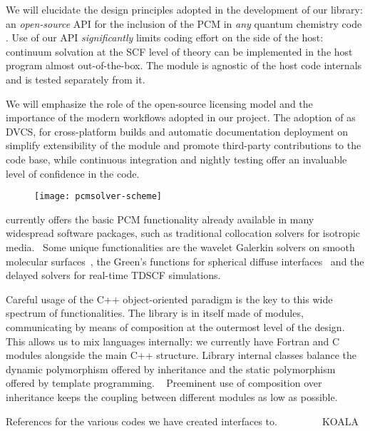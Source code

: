 We will elucidate the design principles adopted in the development of our
\pcmsolver library: an \emph{open-source} \acs{API} for the inclusion of the
PCM in \emph{any} quantum chemistry code \cite{PCMSolver}.  Use of our
\acs{API} \emph{significantly} limits coding effort on the side of the host:
continuum solvation at the \acs{SCF}
level of theory can be implemented in the host program almost out-of-the-box.  The module is
agnostic of the host code internals and is tested separately from it.

We will emphasize the role of the open-source licensing model and the
importance of the modern workflows adopted in our project.  The adoption
of \git as \acs{DVCS}, \cmake for cross-platform builds and automatic
documentation deployment on \readthedocs simplify extensibility of the
module and promote third-party contributions to the code base, while
continuous integration and nightly testing offer an invaluable level of
confidence in the code.

\begin{figure}[!htb]
  \centering
  \texttt{[image: pcmsolver-scheme]}
\end{figure}

\pcmsolver currently offers the basic PCM functionality already
available in many widespread software packages, such as traditional
collocation solvers for isotropic media.~\autocite{Tomasi2005-vm}
Some unique functionalities are the wavelet Galerkin solvers on smooth
molecular surfaces~\autocite{Weijo2010-hy, Bugeanu2015-tp}, the Green’s
functions for spherical diffuse interfaces~\autocite{DiRemigio2016-nn} and
the delayed solvers for real-time \acl{TDSCF}
simulations.~\autocite{Corni2015-pe}

Careful usage of the C++ object-oriented paradigm is the key to this
wide spectrum of functionalities. The library is in itself made of
modules, communicating by means of composition at the outermost
level of the design.
This allows us to mix languages internally: we currently have Fortran
and C modules alongside the main C++ structure.
Library internal classes balance the dynamic polymorphism offered by
inheritance and the static polymorphism offered by template programming.
~\autocite{Alexandrescu2001-bp, Sutter2004-nt, Langr2012-js}
Preeminent use of composition over inheritance keeps the coupling
between different modules as low as possible.~\autocite{Gamma1995-fd}

References for the various codes we have created interfaces to.
\psicode~\autocite{Turney2012-de}
\DIRAC~\autocite{DIRAC15}
\DALTON~\autocite{DALTON16, Aidas2013-rp}
\LSDALTON~\autocite{LSDALTON16, Aidas2013-rp}
\ReSpect~\autocite{ReSpect-3.5.0, OtherStuff}
KOALA~\autocite{Hofener2014-ex, Hofener2016-qz}

